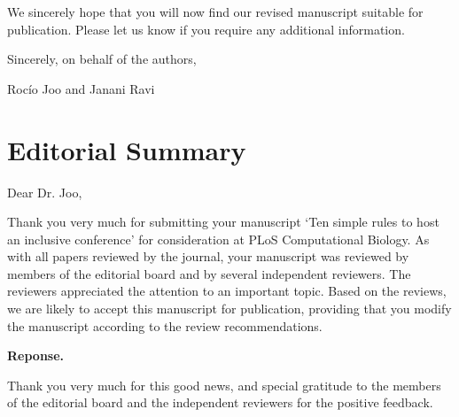 \documentclass{article}
\newenvironment{Reply}{\noindent\color{BlueViolet}\textbf{Reponse.}}{\vspace{1em}}
\begin{document}
We sincerely hope that you will now find our revised manuscript suitable for publication. Please let us know if you require any additional information. 

Sincerely,
on behalf of the authors,

Roc\'io Joo and Janani Ravi


\section*{Editorial Summary} 

Dear Dr. Joo,

Thank you very much for submitting your manuscript `Ten simple rules to host an inclusive conference' for consideration at PLoS Computational Biology. As with all papers reviewed by the journal, your manuscript was reviewed by members of the editorial board and by several independent reviewers. The reviewers appreciated the attention to an important topic. Based on the reviews, we are likely to accept this manuscript for publication, providing that you modify the manuscript according to the review recommendations.

\begin{Reply}

    Thank you very much for this good news, and special gratitude to the members of the editorial board and the independent reviewers for the positive feedback.
\end{Reply}





\end{document}
